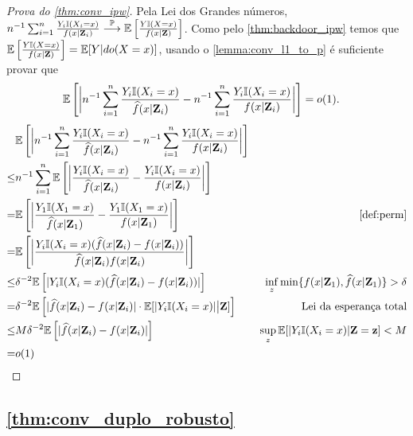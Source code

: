 \begin{proof}[Prova do \cref{thm:conv_ipw}]
 Pela Lei dos Grandes números,
 $n^{-1} \sum_{i=1}^n \frac{Y_i {\mathbb I}(X_i = x)}{f(x|{\mathbf{Z}}_i)} 
 \stackrel{{\mathbb P}}{\longrightarrow} {\mathbb E}\left[\frac{Y {\mathbb I}(X = x)}{f(x|{\mathbf{Z}})}\right]$. Como
 pelo \cref{thm:backdoor_ipw} temos que
 ${\mathbb E}\left[\frac{Y {\mathbb I}(X = x)}{f(x|{\mathbf{Z}})}\right] = {\mathbb E}[Y|do(X=x)]$,
 usando o \cref{lemma:conv_l1_to_p} é suficiente provar que 
 \begin{align*}
 {\mathbb E}\left[\bigg|n^{-1} \sum_{i=1}^n \frac{Y_i {\mathbb I}(X_i = x)}{\widehat{f}(x|{\mathbf{Z}}_i)} 
  - n^{-1} \sum_{i=1}^n \frac{Y_i {\mathbb I}(X_i = x)}{f(x|{\mathbf{Z}}_i)}\bigg|\right]
  &= o(1).
 \end{align*}
 \begin{align*}
  &\E\left[\bigg|n^{-1} \sum_{i=1}^n \frac{Y_i \I(X_i = x)}{\hf(x|\Z_i)} 
  - n^{-1} \sum_{i=1}^n \frac{Y_i \I(X_i = x)}{f(x|\Z_i)}\bigg|\right] \\
  \leq& n^{-1}\sum_{i=1}^n
  \E\left[\bigg|\frac{Y_i \I(X_i = x)}{\hf(x|\Z_i)} 
  -\frac{Y_i \I(X_i = x)}{f(x|\Z_i)}\bigg|\right] \\
  =& \E\left[\bigg|\frac{Y_1 \I(X_1 = x)}{\hf(x|\Z_1)} 
  -\frac{Y_1 \I(X_1 = x)}{f(x|\Z_1)}\bigg|\right]
  & \text{\cref{def:perm}} \\
  =& \E\left[\bigg|\frac{Y_i \I(X_i = x)(\hf(x|\Z_i)-f(x|\Z_i))}
  {\hf(x|\Z_i)f(x|\Z_i)}\bigg|\right] \\
  \leq& \delta^{-2}\E\left[|Y_i \I(X_i = x)(\hf(x|\Z_i)-f(x|\Z_i))|\right] 
  & \inf_z \min\{f(x|\Z_1), \hf(x|\Z_1)\} > \delta \\
  =& \delta^{-2}\E\left[|
  \hf(x|\Z_i)-f(x|\Z_i)|\cdot \E[|Y_i \I(X_i = x)|\big|\Z]\right] 
  & \text{Lei da esperança total} \\
  \leq& M\delta^{-2} \E\left[|\hf(x|\Z_i)-f(x|\Z_i)|\right]
  & \sup_z \E[|Y_i \I(X_i = x)|\Z=\z] < M \\
  =& o(1)
 \end{align*}
\end{proof}

\subsection{\cref{thm:conv_duplo_robusto}}

